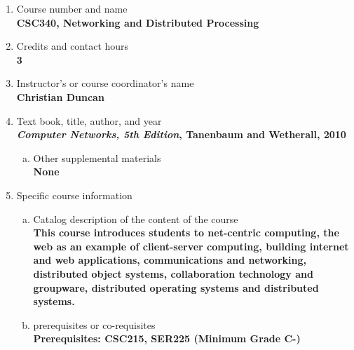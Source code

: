 \label{CSC340}  %
\begin{enumerate}[1.]
\item Course number and name\\
  {\bfseries
    CSC340, Networking and Distributed Processing
  }
  
\item Credits and contact hours\\
  {\bfseries
    3    
  }

\item Instructor's or course coordinator's name\\
  {\bfseries
    Christian Duncan    
  }

\item Text book, title, author, and year\\
  {\bfseries
{\em Computer Networks, 5th Edition}, Tanenbaum and Wetherall, 2010
  }
\begin{enumerate}[a.]
\item Other supplemental materials\\
  {\bfseries
    None    
  }
\end{enumerate}

\item Specific course information
\begin{enumerate}[a.]  
\item Catalog description of the content of the course\\
  {\bfseries
This course introduces students to net-centric computing, the web as an example of client-server computing, building internet and web applications, communications and networking, distributed object systems, collaboration technology and groupware, distributed operating systems and distributed systems.
}

\item prerequisites or co-requisites\\
  {\bfseries
    Prerequisites: CSC215, SER225 (Minimum Grade C-)
  }


\end{enumerate}
\end{enumerate}
